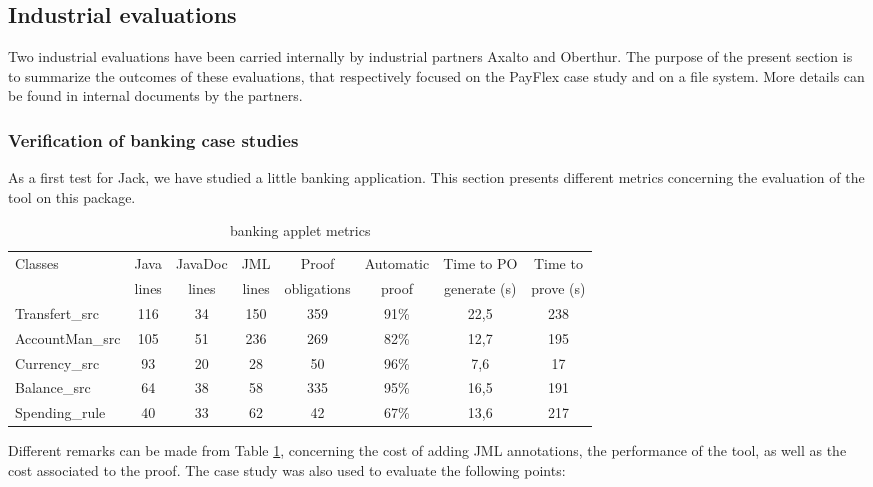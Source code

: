 \subsection{Industrial evaluations}
Two industrial evaluations have been carried internally by industrial
partners Axalto and Oberthur. The purpose of the present section is to
summarize the outcomes of these evaluations, that respectively focused
on the PayFlex case study and on a file system. More details can be
found in internal documents by the partners.

\subsubsection{Verification of banking case studies}
As a first test for Jack, we have studied a little banking
application.  This section presents different metrics concerning the
evaluation of the tool on this package.
\begin{table}
 \begin{tabular}{|l|c|c|c|c|c|c|c|} \hline
 Classes & Java & JavaDoc & JML & Proof & Automatic & Time to PO & Time to \\
  & lines & lines & lines & obligations & proof & generate (s) & prove (s)\\  \hline
 Transfert\_src  & 116 & 34 & 150 & 359 & 91\% & 22,5 & 238 \\
 AccountMan\_src & 105 & 51 & 236 & 269 & 82\% & 12,7 & 195 \\
 Currency\_src   &  93 & 20 &  28 &  50 & 96\% &  7,6 &  17 \\
 Balance\_src    &  64 & 38 &  58 & 335 & 95\% & 16,5 & 191 \\
 Spending\_rule  &  40 & 33 &  62 &  42 & 67\% & 13,6 & 217 \\ \hline
 \end{tabular}
\caption{banking applet metrics}
\label{MetricsTable}
\end{table}
Different remarks can be made from Table \ref{MetricsTable},
concerning the cost of adding JML annotations, the performance 
of the tool, as well as the cost associated to the proof.
The case study was also used to evaluate the following points:
